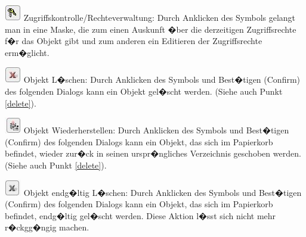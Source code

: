 \includegraphics[scale=0.7]{./images/icons_options_acl.jpg}
    Zugriffskontrolle/Rechteverwaltung: Durch Anklicken des Symbols
    gelangt man in eine Maske, die zum einen Auskunft �ber die
    derzeitigen Zugriffsrechte f�r das Objekt gibt und zum anderen ein
    Editieren der Zugriffsrechte erm�glicht. 

\includegraphics[scale=0.7]{./images/icons_options_trashcan.jpg}
    Objekt L�schen: Durch Anklicken des Symbols und Best�tigen
    (Confirm) des folgenden Dialogs kann ein Objekt gel�scht werden.
    (Siehe auch Punkt \ref{delete}).

\includegraphics[scale=0.7]{./images/icons_options_undelete.jpg}
    Objekt Wiederherstellen: Durch Anklicken des Symbols und Best�tigen
    (Confirm) des folgenden Dialogs kann ein Objekt, das sich im Papierkorb befindet, wieder zur�ck in seinen urspr�ngliches Verzeichnis geschoben werden.
    (Siehe auch Punkt \ref{delete}). 

\includegraphics[scale=0.7]{./images/icons_options_delete.jpg}
    Objekt endg�ltig L�schen: Durch Anklicken des Symbols und Best�tigen
    (Confirm) des folgenden Dialogs kann ein Objekt, das sich im Papierkorb befindet, endg�ltig gel�scht werden. Diese Aktion l�sst sich nicht mehr r�ckgg�ngig machen.

